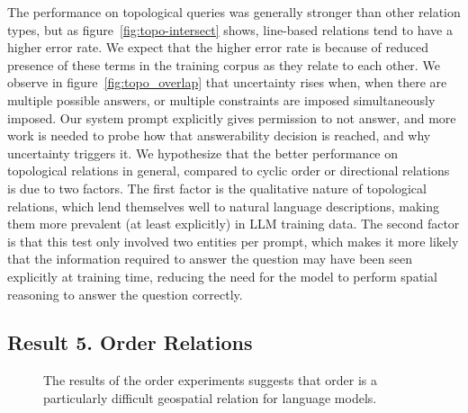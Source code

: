 The performance on topological queries was generally stronger than other relation types, but as figure~\ref{fig:topo-intersect} shows, line-based relations tend to have a higher error rate. 
We expect that the higher error rate is because of reduced presence of these terms in the training corpus as they relate to each other. 
We observe in figure~\ref{fig:topo_overlap} that uncertainty rises when, when there are multiple possible answers, or multiple constraints are imposed simultaneously imposed.
Our system prompt explicitly gives permission to not answer, and more work is needed to probe how that answerability decision is reached, and why uncertainty triggers it. 
We hypothesize that the better performance on topological relations in general, compared to cyclic order or directional relations is due to two factors.
The first factor is the qualitative nature of topological relations, which lend themselves well to natural language descriptions, making them more prevalent (at least explicitly) in LLM training data.
The second factor is that this test only involved two entities per prompt, which makes it more likely that the information required to answer the question may have been seen explicitly at training time, reducing the need for the model to perform spatial reasoning to answer the question correctly.



\subsection{Result 5. Order Relations}

\begin{figure}
    \centering
    
    \caption{The results of the order experiments suggests that order is a particularly difficult geospatial relation for language models.}
    \label{fig:order}
\end{figure}

